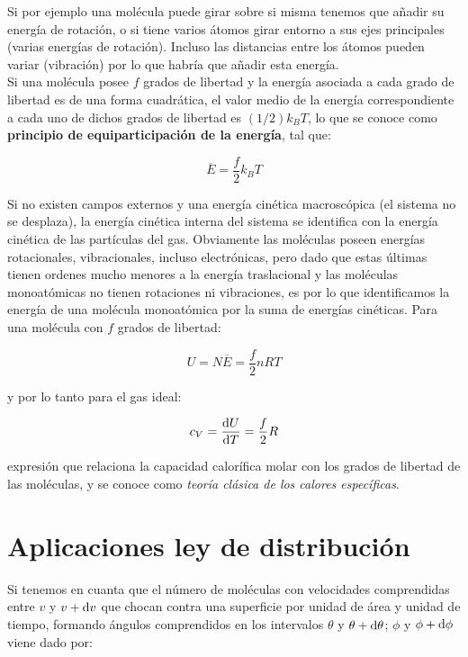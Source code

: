 \documentclass[12pt]{book}
\begin{document}
Si por ejemplo una molécula puede girar sobre si misma tenemos que añadir su energía de rotación, o si tiene varios átomos girar entorno a sus ejes principales (varias energías de rotación). Incluso las distancias entre los átomos pueden variar (vibración) por lo que habría que añadir esta energía. \\
 
Si una molécula posee $f$ grados de libertad y la energía asociada a cada grado de libertad es de una forma cuadrática, el valor medio de la energía correspondiente a cada uno de dichos grados de libertad es $(1/2)k_B T$, lo que se conoce como \textbf{principio de equiparticipación de la energía}, tal que:

\begin{equation}
\overline{E} = \frac{f}{2} k_B T
\end{equation}

Si no existen campos externos y una energía cinética macroscópica (el sistema no se desplaza), la energía cinética interna del sistema se identifica con la energía cinética de las partículas del gas. Obviamente las moléculas poseen energías rotacionales, vibracionales, incluso electrónicas, pero dado que estas últimas tienen ordenes mucho menores a la energía traslacional y las moléculas monoatómicas no tienen rotaciones ni vibraciones, es por lo que identificamos la energía de una molécula monoatómica por la suma de energías cinéticas. Para una molécula con $f$ grados de libertad:

\begin{equation}
U = N \overline{E} = \dfrac{f}{2} n RT
\end{equation}

y por lo tanto para el gas ideal:

\begin{equation}
c_V = \dfrac{\mathrm{d} U}{\mathrm{d} T} = \dfrac{f}{2} R
\end{equation}

expresión que relaciona la capacidad calorífica molar con los grados de libertad de las moléculas, y se conoce como \textit{teoría clásica de los calores específicas}.

\section{Aplicaciones ley de distribución}

Si tenemos en cuanta que el número de moléculas con velocidades comprendidas entre $v$ y $v + \mathrm{d} v$ que chocan contra una superficie por unidad de área y unidad de tiempo, formando ángulos comprendidos en los intervalos $\theta$ y  $\theta + \mathrm{d} \theta$; $\phi$ y $\phi + \mathrm{d} \phi$ viene dado por:
\end{document}

